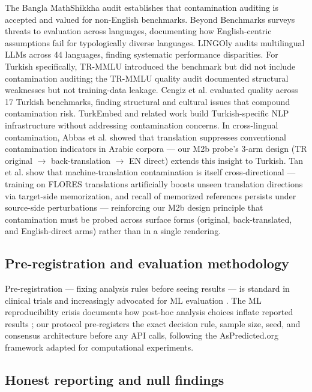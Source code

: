 \documentclass[11pt]{article}
\begin{document}
The Bangla MathShikkha audit \cite{mathshikkha2024} establishes that contamination auditing is accepted and valued for non-English benchmarks. Beyond Benchmarks \cite{beyondbench2025} surveys threats to evaluation across languages, documenting how English-centric assumptions fail for typologically diverse languages. LINGOly \cite{lingoly2024} audits multilingual LLMs across 44 languages, finding systematic performance disparities. For Turkish specifically, TR-MMLU \cite{trmmu2024} introduced the benchmark but did not include contamination auditing; the TR-MMLU quality audit \cite{yildiz2025evaluating} documented structural weaknesses but not training-data leakage. Cengiz et al. \cite{yildiz2025evaluating} evaluated quality across 17 Turkish benchmarks, finding structural and cultural issues that compound contamination risk. TurkEmbed \cite{turkembed2025} and related work build Turkish-specific NLP infrastructure without addressing contamination concerns. In cross-lingual contamination, Abbas et al. \cite{abbas2026obscuring} showed that translation suppresses conventional contamination indicators in Arabic corpora --- our M2b probe's 3-arm design (TR original $\rightarrow$ back-translation $\rightarrow$ EN direct) extends this insight to Turkish. Tan et al. \cite{florence2026} show that machine-translation contamination is itself cross-directional --- training on FLORES translations artificially boosts unseen translation directions via target-side memorization, and recall of memorized references persists under source-side perturbations --- reinforcing our M2b design principle that contamination must be probed across surface forms (original, back-translated, and English-direct arms) rather than in a single rendering.

\subsection{Pre-registration and evaluation methodology}

Pre-registration --- fixing analysis rules before seeing results --- is standard in clinical trials and increasingly advocated for ML evaluation \cite{pineau2020reproducibility}. The ML reproducibility crisis documents how post-hoc analysis choices inflate reported results \cite{pineau2020reproducibility}; our protocol pre-registers the exact decision rule, sample size, seed, and consensus architecture before any API calls, following the AsPredicted.org framework adapted for computational experiments.

\subsection{Honest reporting and null findings}
\end{document}
